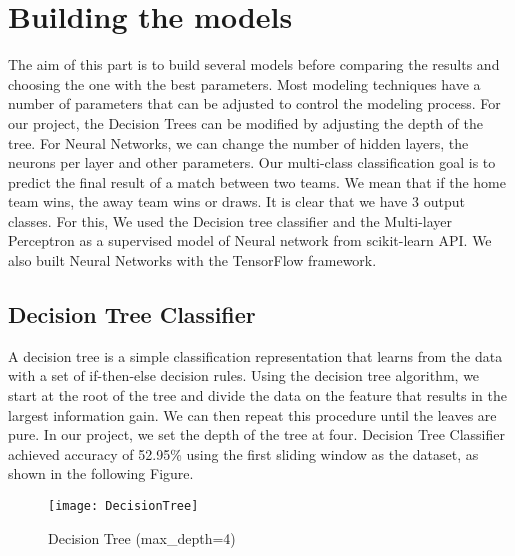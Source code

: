 \section{Building the models}

The aim of this part is to build several models before comparing the results and choosing the one with the best parameters.\newline \newline
Most modeling techniques have a number of parameters that can be adjusted to control the modeling process.
For our project, the Decision Trees can be modified by adjusting the depth of the tree. For Neural Networks, we can change the number of hidden layers, the neurons per layer and other parameters.\newline \newline
Our multi-class classification goal is to predict the final result of a match between two teams. We mean that if the home team wins, the away team wins or draws. It is clear that we have 3 output classes. For this, We used the Decision tree classifier and the Multi-layer Perceptron as a supervised model of Neural network from scikit-learn API. We also built Neural Networks with the TensorFlow framework.


\subsection{Decision Tree Classifier}

A decision tree is a simple classification representation that learns from the data with a set of if-then-else decision rules.\newline \newline
Using the decision tree algorithm, we start at the root of the tree and divide the data on the feature that results in the largest information gain. We can then repeat this procedure until the leaves are pure.\newline \newline
In our project, we set the depth of the tree at four.\newline
Decision Tree Classifier achieved accuracy of 52.95\% using the first sliding window as the dataset, as shown in the following Figure.

\begin{figure}[h]
\label{fig:DecisionTree}
\begin{center}
\texttt{[image: DecisionTree]}
\end{center}
\caption{Decision Tree (max\_depth=4)}
\end{figure}


